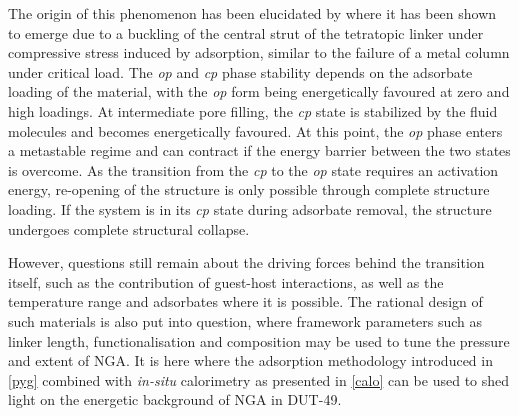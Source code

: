 The origin of this phenomenon has been elucidated by 
\citet{evansOriginsNegativeGas2016} where it has been shown to 
emerge due to a buckling of the central strut of the 
tetratopic linker under compressive stress induced by adsorption,
similar to the failure of a metal column under critical load.
The \textit{op} and \textit{cp} phase stability depends on the 
adsorbate loading of the material, with the \textit{op} form
being energetically favoured at zero and high loadings. 
At intermediate pore filling, the \textit{cp} state is
stabilized by the fluid molecules and becomes energetically
favoured. At this point, the \textit{op} phase enters
a metastable regime and can contract if the energy barrier between the 
two states is overcome. As the transition from the \textit{cp} to the 
\textit{op} state requires an activation energy, re-opening of the 
structure is only possible through complete structure loading.
If the system is in its \textit{cp} state during adsorbate 
removal, the structure undergoes complete structural collapse.

However, questions still remain about the driving forces
behind the transition itself, such as the contribution of 
guest-host interactions, as well as the temperature range 
and adsorbates where it is possible. The rational design 
of such materials is also put into question, where framework
parameters such as linker length, functionalisation and 
composition may be used to tune the pressure and extent of
NGA. It is here where the adsorption methodology introduced
in \autoref{pyg} combined with \textit{in-situ} calorimetry
as presented in \autoref{calo} can be used to shed light 
on the energetic background of NGA in DUT-49.